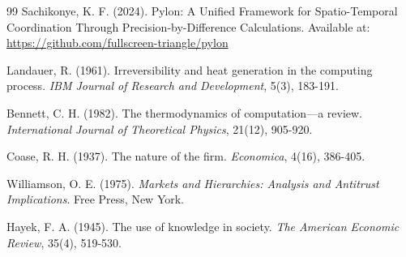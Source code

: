\documentclass[12pt,a4paper]{article}
\begin{document}
\begin{thebibliography}{99}
 Sachikonye, K. F. (2024). Pylon: A Unified Framework for Spatio-Temporal Coordination Through Precision-by-Difference Calculations. Available at: \url{https://github.com/fullscreen-triangle/pylon}

 Landauer, R. (1961). Irreversibility and heat generation in the computing process. \textit{IBM Journal of Research and Development}, 5(3), 183-191.

 Bennett, C. H. (1982). The thermodynamics of computation—a review. \textit{International Journal of Theoretical Physics}, 21(12), 905-920.

 Coase, R. H. (1937). The nature of the firm. \textit{Economica}, 4(16), 386-405.

 Williamson, O. E. (1975). \textit{Markets and Hierarchies: Analysis and Antitrust Implications}. Free Press, New York.

 Hayek, F. A. (1945). The use of knowledge in society. \textit{The American Economic Review}, 35(4), 519-530.

\end{thebibliography}
\end{document}
